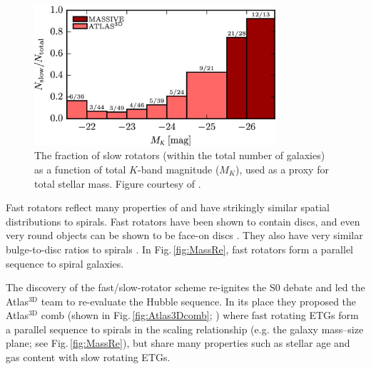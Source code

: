 	\begin{figure}
		\centering
		\includegraphics[width=0.8\textwidth]{introduction/slowRotFraction.jpeg}
		\caption[Proportion of slow rotating galaxies as a function of mass]{The fraction of slow rotators (within the total number of galaxies) as a function of total $K$-band magnitude ($M_K$), used as a proxy for total stellar mass. Figure courtesy of \citet{Veale2017}.}
		\label{fig:SlowRotFrac}
	\end{figure}

	Fast rotators reflect many properties of and have strikingly similar spatial distributions to spirals. Fast rotators have been shown to contain discs, and even very round objects can be shown to be face-on discs \citep[e.g.][]{Cappellari2013a, Weijmans2014}. They also have very similar bulge-to-disc ratios to spirals \citep{Krajnovic2013}. In Fig.\,\ref{fig:MassRe}, fast rotators form a parallel sequence to spiral galaxies.

	The discovery of the fast/slow-rotator scheme re-ignites the S0 debate and led the Atlas$^\text{3D}$ team to re-evaluate the Hubble sequence. In its place they proposed the Atlas$^\text{3D}$ comb (shown in Fig.\,\ref{fig:Atlas3Dcomb}; \citealt{Cappellari2011a}) where fast rotating ETGs form a parallel sequence to spirals in the scaling relationship (e.g. the galaxy mass--size plane; see Fig.\,\ref{fig:MassRe}), but share many properties such as stellar age and gas content with slow rotating ETGs. 


